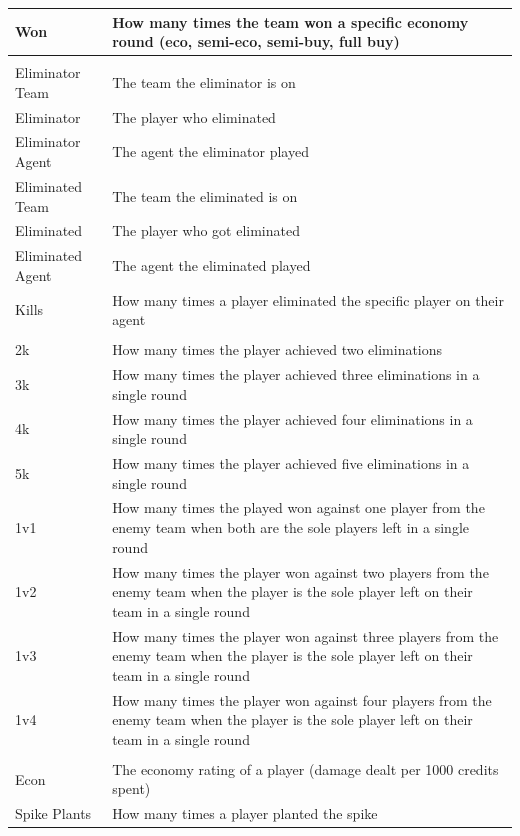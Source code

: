 \begin{longtable}{|>{\raggedright\arraybackslash}p{3cm}|p{12cm}|}
\hline
Won & How many times the team won a specific economy round (eco, semi-eco, semi-buy, full buy) \\
\hline
\multicolumn{2}{|c|}{\textbf{Player Elimination Statistics}} \\
\hline
Eliminator Team & The team the eliminator is on \\
\hline
Eliminator & The player who eliminated \\
\hline
Eliminator Agent & The agent the eliminator played \\
\hline
Eliminated Team & The team the eliminated is on \\
\hline
Eliminated & The player who got eliminated \\
\hline
Eliminated Agent & The agent the eliminated played \\
\hline
Kills & How many times a player eliminated the specific player on their agent \\
\hline
\multicolumn{2}{|c|}{\textbf{Multi-Kill \& Clutch Statistics}} \\
\hline
2k & How many times the player achieved two eliminations \\
\hline
3k & How many times the player achieved three eliminations in a single round \\
\hline
4k & How many times the player achieved four eliminations in a single round \\
\hline
5k & How many times the player achieved five eliminations in a single round \\
\hline
1v1 & How many times the played won against one player from the enemy team when both are the sole players left in a single round \\
\hline
1v2 & How many times the player won against two players from the enemy team when the player is the sole player left on their team in a single round \\
\hline
1v3 & How many times the player won against three players from the enemy team when the player is the sole player left on their team in a single round \\
\hline
1v4 & How many times the player won against four players from the enemy team when the player is the sole player left on their team in a single round \\
\hline
\multicolumn{2}{|c|}{\textbf{Individual Player Performance}} \\
\hline
Econ & The economy rating of a player (damage dealt per 1000 credits spent) \\
\hline
Spike Plants & How many times a player planted the spike \\

\end{longtable}
